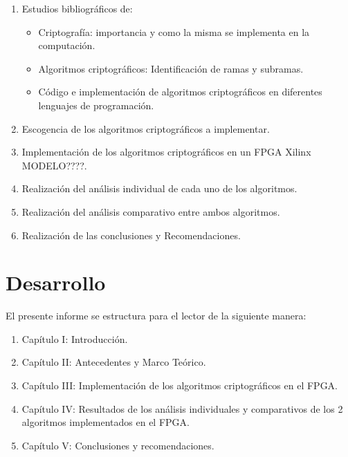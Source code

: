 \begin{enumerate}

\item Estudios bibliográficos de:

\begin{itemize}
	\item Criptografía: importancia y como la misma se implementa en la computación.
	\item Algoritmos criptográficos: Identificación de ramas y subramas.
	\item Código e implementación de algoritmos criptográficos en diferentes lenguajes de programación.
\end{itemize}

\item Escogencia de los algoritmos criptográficos a implementar.

\item Implementación de los algoritmos criptográficos en un FPGA Xilinx MODELO????.

\item Realización del análisis individual de cada uno de los algoritmos.

\item Realización del análisis comparativo entre ambos algoritmos.

\item Realización de las conclusiones y Recomendaciones.

\end{enumerate}

\section{Desarrollo}

El presente informe se estructura para el lector de la siguiente manera:

\begin{enumerate}
\item Capítulo I: Introducción.

\item Capítulo II: Antecedentes y Marco Teórico. 

\item Capítulo III: Implementación de los algoritmos criptográficos en el FPGA.

\item Capítulo IV: Resultados de los análisis individuales y comparativos de los 2 algoritmos implementados en el FPGA.

\item Capítulo V: Conclusiones y recomendaciones.

\end{enumerate}
